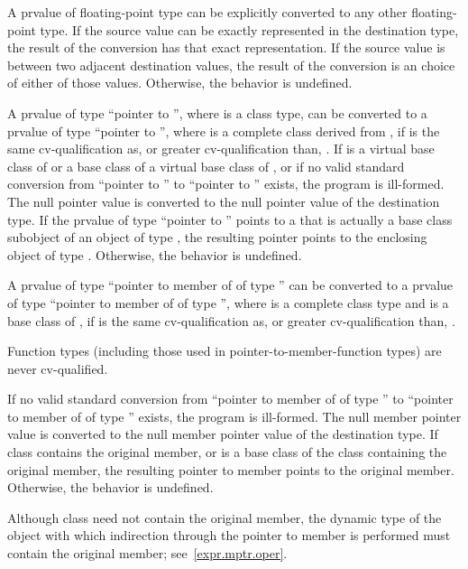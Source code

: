 \pnum
A prvalue of floating-point type can be explicitly converted to
any other floating-point type.
If the source value can be exactly represented in the destination type,
the result of the conversion has that exact representation.
If the source value is between two adjacent destination values,
the result of the conversion is
an  choice of
either of those values.
Otherwise, the behavior is undefined.

\pnum
{}%
%
A prvalue of type ``pointer to  '', where 
is a class type, can be converted to a prvalue of type ``pointer to
 '',
where  is a complete class derived
from ,
if  is the same cv-qualification as,
or greater cv-qualification than, .
If  is a virtual base class of  or
a base class of a virtual base class of , or
if no valid standard conversion from ``pointer to ''
to ``pointer to '' exists, the program is ill-formed.
The null pointer value is converted
to the null pointer value of the destination type. If the prvalue of type
``pointer to  '' points to a  that is
actually a base class subobject of an object of type , the resulting
pointer points to the enclosing object of type . Otherwise, the
behavior is undefined.

\pnum
{}%
A prvalue of type ``pointer to member of  of type 
'' can be converted to a prvalue of type ``pointer to member of
 of type  '', where
 is a complete class type and
 is a base class of ,
if  is the same cv-qualification
as, or greater cv-qualification than, .
\begin{note}
Function types (including those used in pointer-to-member-function types)
are never cv-qualified.
\end{note}
If no valid standard conversion
from ``pointer to member of  of type ''
to ``pointer to member of  of type ''
exists, the program is ill-formed.
The null member pointer value is converted to the null
member pointer value of the destination type. If class 
contains the original member, or is a base class of the class
containing the original member, the resulting pointer to member points
to the original member. Otherwise, the behavior is undefined.
\begin{note}
Although class  need not contain the original member, the
dynamic type of the object with which indirection through the pointer
to member is performed must contain the original member;
see~\ref{expr.mptr.oper}.
\end{note}

